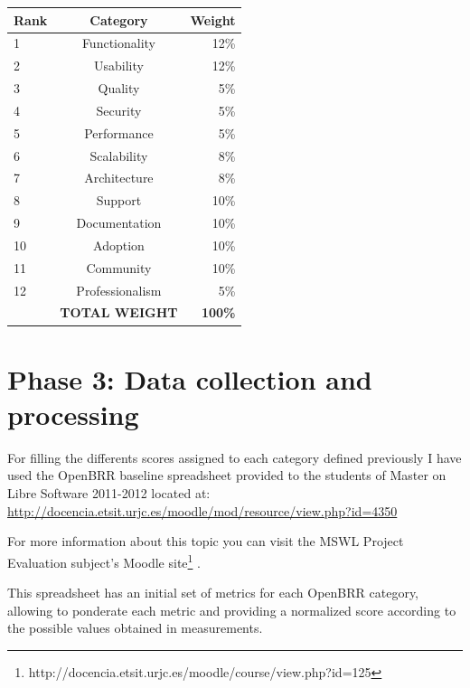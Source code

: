 \documentclass[a4paper,12pt]{book}
\begin{document}
\begin{table}[ht]
\begin{center}
    \begin{tabular}{ | l | c | r |}
    \hline
    \textbf{Rank} & \textbf{Category} & \textbf{Weight} \\ \hline
    1 & Functionality & 12\% \\ \hline
    2 & Usability & 12\% \\ \hline
    3 & Quality & 5\% \\ \hline
    4 & Security & 5\% \\ \hline
    5 & Performance & 5\% \\ \hline
    6 & Scalability & 8\% \\ \hline
    7 & Architecture & 8\% \\ \hline
    8 & Support & 10\% \\ \hline
    9 & Documentation & 10\% \\ \hline
    10 & Adoption & 10\% \\ \hline
    11 & Community & 10\% \\ \hline
    12 & Professionalism & 5\% \\ \hline
     & \textbf{TOTAL WEIGHT} & \textbf{100\%} \\ \hline  
    \end{tabular}
\end{center}
\label{OpenBRR2}
\end{table}

\section{Phase 3: Data collection and processing}
\label{sec:phase3}
For filling the differents scores assigned to each category defined previously I have used the OpenBRR baseline spreadsheet provided to the students of Master on Libre Software 2011-2012 located at:\\
\url{http://docencia.etsit.urjc.es/moodle/mod/resource/view.php?id=4350}

For more information about this topic you can visit the MSWL Project Evaluation subject's Moodle site\footnote{http://docencia.etsit.urjc.es/moodle/course/view.php?id=125} .

This spreadsheet has an initial set of metrics for each OpenBRR category, allowing to ponderate each metric and providing a normalized score according to the possible values obtained in measurements.
\end{document}
